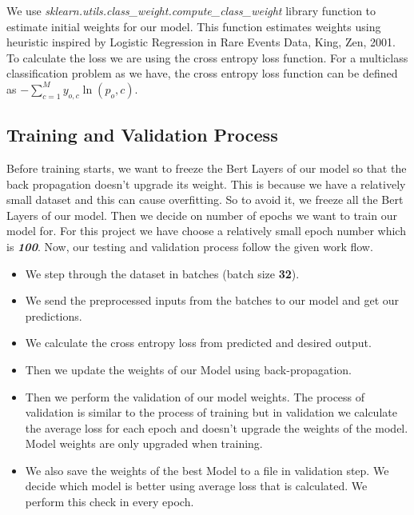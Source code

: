 \documentclass[a4paper, 12pt]{article}
\begin{document}
\begin{sloppypar}
  We use \textit{sklearn.utils.class\_weight.compute\_class\_weight} library function to estimate initial weights for our model. This function estimates weights using heuristic inspired by  Logistic Regression in Rare Events Data, King, Zen, 2001.\cite{king_logistic_2001}
  To calculate the loss we are using the cross entropy loss function. For a multiclass classification problem as we have, the cross entropy loss function can be defined as \large $- \sum_{c=1}^{M} y_{o,c} \ln(p_o,c)$.\cite{noauthor_loss_nodate}
  \normalsize
  
  \subsection{Training and Validation Process}
  Before training starts, we want to freeze the Bert Layers of our model so that the back propagation doesn't upgrade its weight. This is because we have a relatively small dataset and this can cause overfitting. So to avoid it, we freeze all the Bert Layers of our model. Then we decide on number of epochs we want to train our model for. For this project we have choose a relatively small epoch number which is \textbf{\textit{100}}. Now, our testing and validation process follow the given work flow.
  \begin{itemize}
  \item We step through the dataset in batches (batch size \textbf{32}).
  \item We send the preprocessed inputs from the batches to our model and get our predictions.
  \item We calculate the cross entropy loss from predicted and desired output.
  \item Then we update the weights of our Model using back-propagation. 
  \item Then we perform the validation of our model weights. The process of validation is similar to the process of training but in validation we calculate the average loss for each epoch and doesn't upgrade the weights of the model. Model weights are only upgraded when training.
  \item We also save the weights of the best Model to a file in validation step. We decide which model is better using average loss that is calculated. We perform this check in every epoch.
  \end{itemize}
  

\end{sloppypar}
\end{document}
